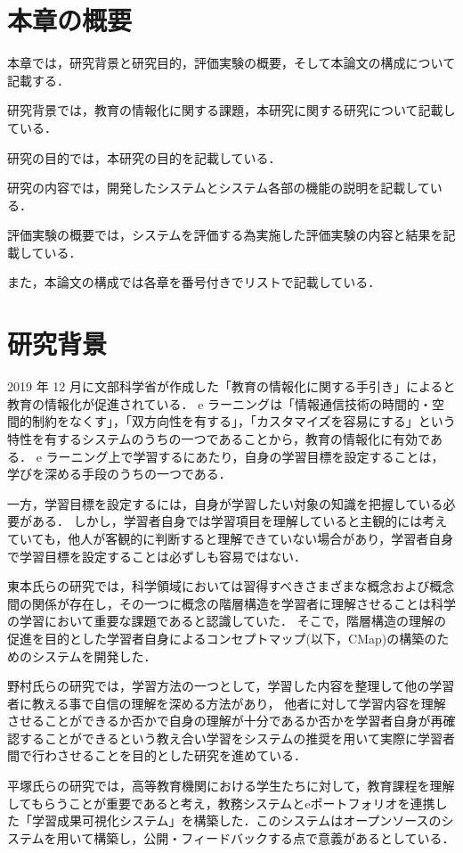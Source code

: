 \section{本章の概要}
本章では，研究背景と研究目的，評価実験の概要，そして本論文の構成について記載する．

研究背景では，教育の情報化に関する課題，本研究に関する研究について記載している．

研究の目的では，本研究の目的を記載している．

研究の内容では，開発したシステムとシステム各部の機能の説明を記載している．

評価実験の概要では，システムを評価する為実施した評価実験の内容と結果を記載している．

また，本論文の構成では各章を番号付きでリストで記載している．

\section{研究背景}
2019 年 12 月に文部科学省が作成した「教育の情報化に関する手引き」\cite{tebiki}によると教育の情報化が促進されている．
e ラーニング\cite{e}は「情報通信技術の時間的・空間的制約をなくす」，「双方向性を有する」，「カスタマイズを容易にする」という特性を有するシステムのうちの一つであることから，教育の情報化に有効である．
e ラーニング上で学習するにあたり，自身の学習目標を設定することは，学びを深める手段のうちの一つである\cite{seman}．

一方，学習目標を設定するには，自身が学習したい対象の知識を把握している必要がある．
しかし，学習者自身では学習項目を理解していると主観的には考えていても，他人が客観的に判断すると理解できていない場合があり，学習者自身で学習目標を設定することは必ずしも容易ではない．

東本氏らの研究では，科学領域においては習得すべきさまざまな概念および概念間の関係が存在し，その一つに概念の階層構造を学習者に理解させることは科学の学習において重要な課題であると認識していた．
そこで，階層構造の理解の促進を目的とした学習者自身によるコンセプトマップ(以下，CMap)\cite{concept}の構築のためのシステムを開発した\cite{toumoto}．

野村氏らの研究では，学習方法の一つとして，学習した内容を整理して他の学習者に教える事で自信の理解を深める方法があり，
他者に対して学習内容を理解させることができるか否かで自身の理解が十分であるか否かを学習者自身が再確認することができるという教え合い学習をシステムの推奨を用いて実際に学習者間で行わさせることを目的とした研究を進めている\cite{nomura}．

平塚氏らの研究では，高等教育機関における学生たちに対して，教育課程を理解してもらうことが重要であると考え，教務システムとeポートフォリオを連携した「学習成果可視化システム」を構築した．このシステムはオープンソースのシステムを用いて構築し，公開・フィードバックする点で意義があるとしている\cite{hira}．

